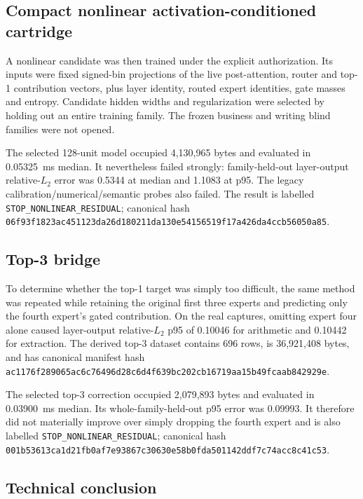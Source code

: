 \subsection{Compact nonlinear activation-conditioned cartridge}

A nonlinear candidate was then trained under the explicit authorization.  Its
inputs were fixed signed-bin projections of the live post-attention, router and
top-1 contribution vectors, plus layer identity, routed expert identities, gate
masses and entropy.  Candidate hidden widths and regularization were selected by
holding out an entire training family.  The frozen business and writing blind
families were not opened.

The selected 128-unit model occupied 4,130,965 bytes and evaluated in 0.05325~ms
median.  It nevertheless failed strongly: family-held-out layer-output
relative-$L_2$ error was 0.5344 at median and 1.1083 at p95.  The legacy
calibration/numerical/semantic probes also failed.  The result is labelled
\texttt{STOP\_NONLINEAR\_RESIDUAL}; canonical hash
\texttt{06f93f1823ac451123da26d180211da130e54156519f17a426da4ccb56050a85}.

\subsection{Top-3 bridge}

To determine whether the top-1 target was simply too difficult, the same method
was repeated while retaining the original first three experts and predicting
only the fourth expert's gated contribution.  On the real captures, omitting
expert four alone caused layer-output relative-$L_2$ p95 of 0.10046 for
arithmetic and 0.10442 for extraction.  The derived top-3 dataset contains 696
rows, is 36,921,408 bytes, and has canonical manifest hash
\texttt{ac1176f289065ac6c76496d28c6d4f639bc202cb16719aa15b49fcaab842929e}.

The selected top-3 correction occupied 2,079,893 bytes and evaluated in
0.03900~ms median.  Its whole-family-held-out p95 error was 0.09993.  It therefore
did not materially improve over simply dropping the fourth expert and is also
labelled \texttt{STOP\_NONLINEAR\_RESIDUAL}; canonical hash
\texttt{001b53613ca1d21fb0af7e93867c30630e58b0fda501142ddf7c74acc8c41c53}.

\subsection{Technical conclusion}

